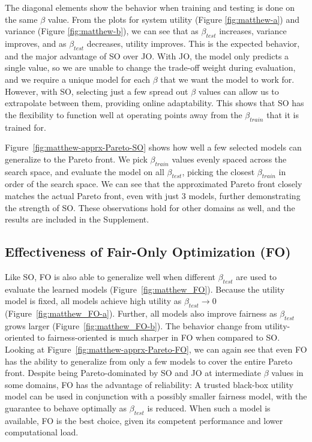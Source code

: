 The diagonal elements show the behavior when training and testing is done on the same $\beta$ value.  
From the plots for system utility (Figure \ref{fig:matthew-a}) and variance (Figure \ref{fig:matthew-b}), we can see that as $\beta_{test}$ increases, variance improves, and as $\beta_{test}$ decreases, utility improves. This is the expected behavior, and the major advantage of SO over JO. With JO, the model only predicts a single value, so we are unable to change the trade-off weight during evaluation, and we require a unique model for each $\beta$ that we want the model to work for. However, with SO, selecting just a few spread out $\beta$ values can allow us to extrapolate between them, providing online adaptability.
This shows that SO has the flexibility to function well at operating points away from the $\beta_{train}$ that it is trained for.

Figure~\ref{fig:matthew-apprx-Pareto-SO} shows how well a few selected models can generalize to the Pareto front. We pick $\beta_{train}$ values evenly spaced across the search space, and evaluate the model on all $\beta_{test}$, picking the closest $\beta_{train}$ in order of the search space. We can see that the approximated Pareto front closely matches the actual Pareto front, even with just 3 models, further demonstrating the strength of SO.
These observations hold for other domains as well, and the results are included in the Supplement.

\subsection{Effectiveness of Fair-Only Optimization (FO)}
Like SO, FO is also able to generalize well when different $\beta_{test}$ are used to evaluate the learned models (Figure~\ref{fig:matthew_FO}). Because the utility model is fixed, all models achieve high utility as $\beta_{test}\xrightarrow{}0$ (Figure~\ref{fig:matthew_FO-a}). Further, all models also improve fairness as $\beta_{test}$ grows larger (Figure~\ref{fig:matthew_FO-b}). The behavior change from utility-oriented to fairness-oriented is much sharper in FO when compared to SO. 
Looking at Figure~\ref{fig:matthew-apprx-Pareto-FO}, we can again see that even FO has the ability to generalize from only a few models to cover the entire Pareto front. 
Despite being Pareto-dominated by SO and JO at intermediate $\beta$ values in some domains, FO has the advantage of reliability: A trusted black-box utility model can be used in conjunction with a possibly smaller fairness model, with the guarantee to behave optimally as $\beta_{test}$ is reduced. When such a model is available, FO is the best choice, given its competent performance and lower computational load.

